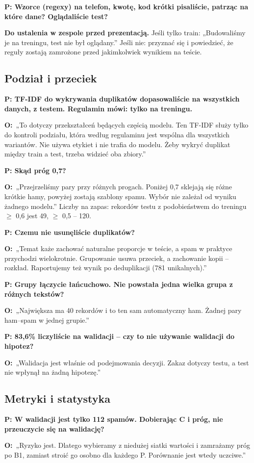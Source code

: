 \documentclass[11pt,a4paper]{article}
\newcommand{\pyt}[1]{\par\medskip\textbf{\color{spam}P: #1}\par}
\newcommand{\odp}{\textbf{O:}~}
\begin{document}
\pyt{Wzorce (regexy) na telefon, kwotę, kod krótki pisaliście, patrząc na które dane? Oglądaliście test?}
\textbf{Do ustalenia w zespole przed prezentacją.} Jeśli tylko train: „Budowaliśmy je na treningu, test nie był oglądany.”
Jeśli nie: przyznać się i powiedzieć, że reguły zostają zamrożone przed jakimkolwiek wynikiem na teście.

\subsection{Podział i przeciek}

\pyt{TF-IDF do wykrywania duplikatów dopasowaliście na wszystkich danych, z testem. Regulamin mówi: tylko na treningu.}
\odp „To dotyczy przekształceń będących częścią modelu. Ten TF-IDF służy tylko do kontroli podziału, która według regulaminu
jest wspólna dla wszystkich wariantów. Nie używa etykiet i nie trafia do modelu. Żeby wykryć duplikat między train a test,
trzeba widzieć oba zbiory.”

\pyt{Skąd próg 0,7?}
\odp „Przejrzeliśmy pary przy różnych progach. Poniżej 0,7 sklejają się różne krótkie hamy, powyżej zostają szablony spamu.
Wybór nie zależał od wyniku żadnego modelu.” Liczby na zapas: rekordów testu z podobieństwem do treningu $\geq$ 0,6 jest 49,
$\geq$ 0,5 -- 120.

\pyt{Czemu nie usunęliście duplikatów?}
\odp „Temat każe zachować naturalne proporcje w teście, a spam w praktyce przychodzi wielokrotnie. Grupowanie usuwa przeciek,
a zachowanie kopii -- rozkład. Raportujemy też wynik po deduplikacji (781 unikalnych).”

\pyt{Grupy łączycie łańcuchowo. Nie powstała jedna wielka grupa z różnych tekstów?}
\odp „Największa ma 40 rekordów i to ten sam automatyczny ham. Żadnej pary ham--spam w jednej grupie.”

\pyt{83,6\% liczyliście na walidacji -- czy to nie używanie walidacji do hipotez?}
\odp „Walidacja jest właśnie od podejmowania decyzji. Zakaz dotyczy testu, a test nie wpłynął na żadną hipotezę.”

\subsection{Metryki i statystyka}

\pyt{W walidacji jest tylko 112 spamów. Dobierając C i próg, nie przeuczycie się na walidację?}
\odp „Ryzyko jest. Dlatego wybieramy z niedużej siatki wartości i zamrażamy próg po B1, zamiast stroić go osobno dla każdego
P. Porównanie jest wtedy uczciwe.”
\end{document}

